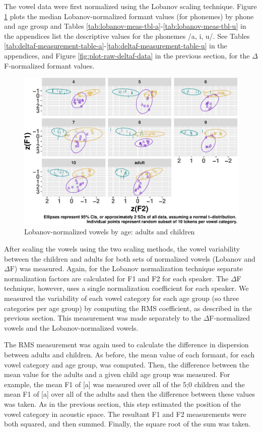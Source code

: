 \documentclass[
]{article}
\begin{document}
The vowel data were first normalized using the Lobanov scaling technique. Figure \ref{fig:plot-raw-lobanov-data} plots the median Lobanov-normalized formant values (for phonemes) by phone and age group and Tables \ref{tab:lobanov-meas-tbl-a}-\ref{tab:lobanov-meas-tbl-u} in the appendices list the descriptive values for the phonemes /a, i, u/. See Tables \ref{tab:deltaf-measurement-table-a}-\ref{tab:deltaf-measurement-table-u} in the appendices, and Figure \ref{fig:plot-raw-deltaf-data} in the previous section, for the \(\Delta\)F-normalized formant values.

\begin{figure}
\centering
\includegraphics{3_vtl_results_files/figure-latex/plot-raw-lobanov-data-1.pdf}
\caption{\label{fig:plot-raw-lobanov-data}Lobanov-normalized vowels by age:
adults and children}
\end{figure}

After scaling the vowels using the two scaling methods, the vowel variability between the children and adults for both sets of normalized vowels (Lobanov and \(\Delta\)F) was measured. Again, for the Lobanov normalization technique separate normalization factors are calculated for F1 and F2 for each speaker. The \(\Delta\)F technique, however, uses a single normalization coefficient for each speaker. We measured the variability of each vowel category for each age group (so three categories per age group) by computing the RMS coefficient, as described in the previous section. This measurement was made separately to the \(\Delta\)F-normalized vowels and the Lobanov-normalized vowels.

The RMS measurement was again used to calculate the difference in dispersion between adults and children. As before, the mean value of each formant, for each vowel category and age group, was computed. Then, the difference between the mean value for the adults and a given child age group was measured. For example, the mean F1 of {[}a{]} was measured over all of the 5;0 children and the mean F1 of {[}a{]} over all of the adults and then the difference between these values was taken. As in the previous section, this step estimated the position of the vowel category in acoustic space. The resultant F1 and F2 measurements were both squared, and then summed. Finally, the square root of the sum was taken.
\end{document}

